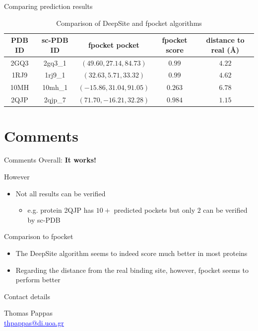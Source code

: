 \documentclass{beamer}
\newcommand{\link}[2]{\href{#1}{\textcolor{blue}{\underline{#2}}}}
\begin{document}
\begin{frame}{Comparing prediction results}
  \begin{tiny}
  \begin{table}
  \caption{Comparison of DeepSite and fpocket algorithms}
  \label{table:5}
  \begin{tabular}{ c | c | c | c | c }
    PDB ID & sc-PDB ID & fpocket pocket & fpocket score & distance to real (\AA) \\
    \hline
    2GQ3 & 2gq3\_1 & $(49.60, 27.14, 84.73)$ & $0.99$ & $4.22$ \\
    1RJ9 & 1rj9\_1 & $(32.63, 5.71, 33.32)$ & $0.99$ & $4.62$ \\
    10MH & 10mh\_1 & $(-15.86, 31.04, 91.05)$ & $0.263$ & $6.78$ \\
    2QJP & 2qjp\_7 & $(71.70, -16.21, 32.28)$ & $0.984$ & $1.15$
  \end{tabular}
  \end{table}
  \end{tiny}
\end{frame}

\section{Comments}

\begin{frame}{Comments}
  Overall: \textbf{It works!}
  
  \begin{block}{However}
    \begin{itemize}
      \item Not all results can be verified
      \begin{itemize}
        \item e.g. protein 2QJP has $10+$ predicted pockets but only $2$ can be verified by sc-PDB
      \end{itemize}
    \end{itemize}
  \end{block}
  
  \begin{block}{Comparison to fpocket}
    \begin{itemize}
      \item The DeepSite algorithm seems to indeed score much better in most proteins
      \item Regarding the distance from the real binding site, however, fpocket seems to perform better
    \end{itemize}
  \end{block}
\end{frame}

\begin{frame}{Contact details}
  \begin{center}
    Thomas Pappas\\
    \link{mailto:thpappas@di.uoa.gr}{thpappas@di.uoa.gr}
  \end{center}
\end{frame}
\end{document}
